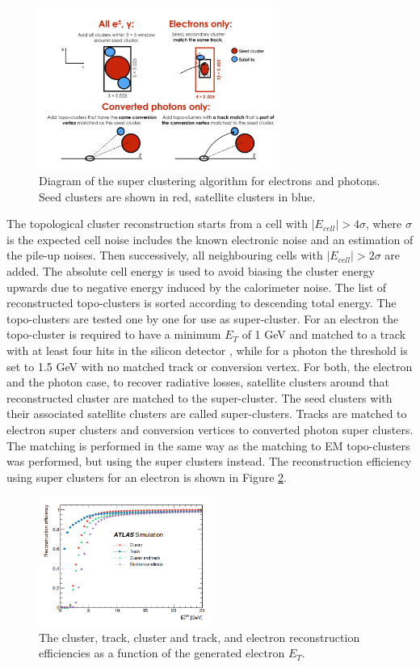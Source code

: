 \begin{figure}[htbp]
    \centering
    \includegraphics[width=0.7\textwidth]{Ch2/Img/Super_cluster.png}
    \caption{Diagram of the super clustering algorithm for electrons and photons. Seed clusters are shown in red, satellite clusters in blue.}
    \label{fig:chap2:Objetcs:Egamma:SC}
\end{figure}
The topological cluster reconstruction starts from a cell with $|E_{cell}| > 4\sigma$, where $\sigma$ is the expected cell noise includes the known electronic noise and an estimation of the pile-up noises. Then successively, all neighbouring cells with $|E_{cell}| > 2\sigma$ are added. The absolute cell energy is used to avoid biasing the cluster energy upwards due to negative energy induced by the calorimeter noise. The list of reconstructed topo-clusters is sorted according to descending total energy. The topo-clusters are tested one by one for use as super-cluster. For an electron the topo-cluster is required to have a minimum $E_T$ of 1 GeV and matched to a track with at least four hits in the silicon detector \cite{GSF}, while for a photon the threshold is set to 1.5 GeV with no matched track or conversion vertex. For both, the electron and the photon case, to recover radiative losses, satellite clusters around that reconstructed cluster are matched to the super-cluster. The seed clusters with their associated satellite clusters are called super-clusters. Tracks are matched to electron super clusters and conversion vertices to converted photon super clusters. The matching is performed in the same way as the matching to EM topo-clusters was performed, but using the super clusters instead. The reconstruction efficiency using super clusters for an electron is shown in Figure \ref{fig:chap2:Objects:Egamma:El_Eff}.
\begin{figure}[htbp]
    \centering
    \includegraphics[width=0.5\textwidth]{Ch2/Img/Electron_Reco_Eff.png}
    \caption{The cluster, track, cluster and track, and electron reconstruction efficiencies as a function of the generated electron $E_T$.}
    \label{fig:chap2:Objects:Egamma:El_Eff}
\end{figure}
